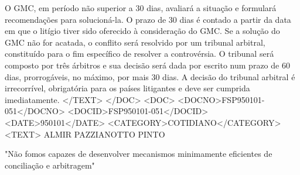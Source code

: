 O GMC, em período não superior a 30 dias, avaliará a situação e formulará recomendações para solucioná-la. O prazo de 30 dias é contado a partir da data em que o litígio tiver sido oferecido à consideração do GMC.
Se a solução do GMC não for acatada, o conflito será resolvido por um tribunal arbitral, constituído para o fim específico de resolver a controvérsia.
O tribunal será composto por três árbitros e sua decisão será dada por escrito num prazo de 60 dias, prorrogáveis, no máximo, por mais 30 dias. A decisão do tribunal arbitral é irrecorrível, obrigatória para os países litigantes e deve ser cumprida imediatamente.
</TEXT>
</DOC>
<DOC>
<DOCNO>FSP950101-051</DOCNO>
<DOCID>FSP950101-051</DOCID>
<DATE>950101</DATE>
<CATEGORY>COTIDIANO</CATEGORY>
<TEXT>
ALMIR PAZZIANOTTO PINTO 

"Não fomos capazes de desenvolver mecanismos minimamente eficientes de conciliação e arbitragem" 

